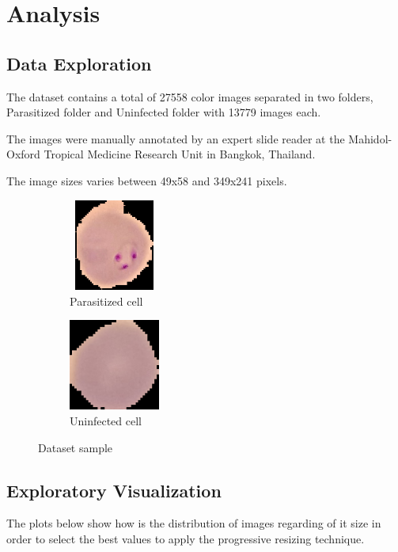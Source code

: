 \documentclass[a4paper]{article}
\begin{document}
\newpage

	\section{Analysis}
	\subsection{Data Exploration}	
	The dataset contains a total of 27558 color images separated in two folders, Parasitized folder and
	Uninfected folder with 13779 images each.
	
	\medskip
	The images were manually annotated by an expert slide reader at the Mahidol-Oxford Tropical Medicine Research Unit in Bangkok, Thailand.
	
	\medskip
	The image sizes varies between 49x58 and 349x241 pixels.
	
	\begin{figure}[h!]
		\centering
		\begin{subfigure}[b]{0.4\linewidth}
			\centering
			\captionsetup{justification=centering}
			\includegraphics[width=3cm, height=3cm]{parasitized.png}
			\caption{Parasitized cell}
		\end{subfigure}\quad
		\begin{subfigure}[b]{0.4\linewidth}
			\centering
			\captionsetup{justification=centering}
			\includegraphics[width=3cm, height=3cm]{uninfected.png}
			\caption{Uninfected cell}
		\end{subfigure}
		\caption{Dataset sample}
		\label{fig:cells}
	\end{figure}

	\subsection{Exploratory Visualization}
	The plots below show how is the distribution of images regarding of it size in order to select the best values to apply the progressive resizing technique.
	
\end{document}
